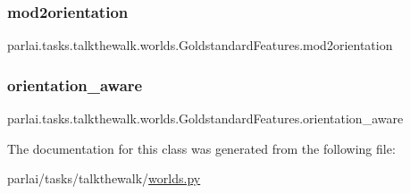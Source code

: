\subsubsection{\texorpdfstring{mod2orientation}{mod2orientation}}
{\footnotesize\ttfamily parlai.\+tasks.\+talkthewalk.\+worlds.\+Goldstandard\+Features.\+mod2orientation}

\mbox{\label{classparlai_1_1tasks_1_1talkthewalk_1_1worlds_1_1GoldstandardFeatures_a2b5d762f31d162dbbd702b9c6753830f}} 
\subsubsection{\texorpdfstring{orientation\+\_\+aware}{orientation\_aware}}
{\footnotesize\ttfamily parlai.\+tasks.\+talkthewalk.\+worlds.\+Goldstandard\+Features.\+orientation\+\_\+aware}



The documentation for this class was generated from the following file\+:\begin{DoxyCompactItemize}
\item 
parlai/tasks/talkthewalk/\hyperlink{parlai_2tasks_2talkthewalk_2worlds_8py}{worlds.\+py}\end{DoxyCompactItemize}
